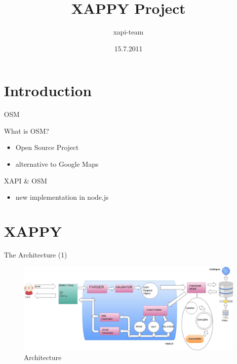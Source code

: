 \documentclass{beamer}
\title{XAPPY Project}
\author{xapi-team}
\institute{Institute for Computer Science, Free University Berlin}
\date{15.7.2011}
\begin{document}
\begin{frame}
	\titlepage
\end{frame}

\begin{frame}
	\tableofcontents
\end{frame}


\section{Introduction}
\begin{frame}{OSM}
	\begin{block}{What is OSM?}
		\begin{itemize}
			\item Open Source Project
			\item alternative to Google Maps
		\end{itemize}
	\end{block}
\end{frame}

\begin{frame}{XAPI \& OSM}
	\begin{block}{}
		\begin{itemize}
			\item new implementation in node.js
		\end{itemize}
	\end{block}
\end{frame}


\section{XAPPY}
\begin{frame}{The Architecture (1)}
	\begin{figure}
		\includegraphics[width=1\textwidth]{../images/xapi.jpg} 
		\caption{Architecture}
		\label{architecture}
	\end{figure}
\end{frame}
\end{document}
